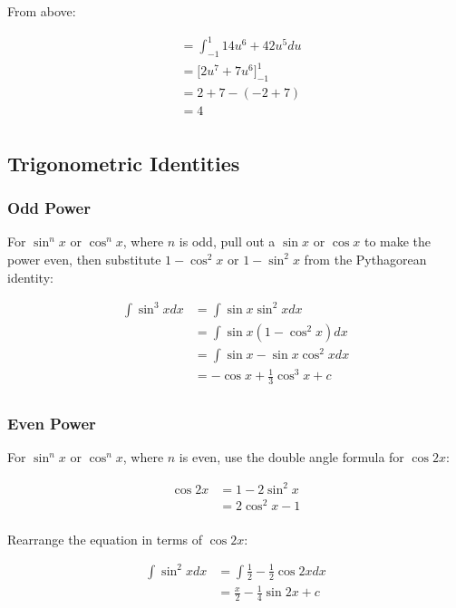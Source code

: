 \documentclass[a4paper,11pt]{report}
\begin{document}
From above:

$$
\begin{aligned}
& = \int_{-1}^1 14u^6 + 42u^5 du \\
& = \big[2u^7 + 7u^6\big]_{-1}^1 \\
& = 2 + 7 - (-2 + 7) \\
& = 4 \\
\end{aligned}
$$

\subsection{Trigonometric Identities}

\subsubsection{Odd Power}

For $\sin^n{x}$ or $\cos^n{x}$, where $n$ is odd, pull out a $\sin{x}$ or
$\cos{x}$ to make the power even, then substitute $1 - \cos^2{x}$ or
$1 - \sin^2{x}$ from the Pythagorean identity:

$$
\begin{aligned}
\int \sin^3{x} dx & = \int \sin{x}\sin^2{x} dx \\
& = \int \sin{x}(1 - \cos^2{x}) dx \\
& = \int \sin{x} - \sin{x}\cos^2{x} dx \\
& = -\cos{x} + \frac{1}{3} \cos^3{x} + c \\
\end{aligned}
$$

\subsubsection{Even Power}

For $\sin^n{x}$ or $\cos^n{x}$, where $n$ is even, use the double angle formula
for $\cos{2x}$:

$$
\begin{aligned}
\cos{2x} & = 1 - 2\sin^2{x} \\
& = 2\cos^2{x} - 1 \\
\end{aligned}
$$

Rearrange the equation in terms of $\cos{2x}$:

$$
\begin{aligned}
\int \sin^2{x} dx & = \int \frac{1}{2} - \frac{1}{2}\cos{2x} dx \\
& = \frac{x}{2} - \frac{1}{4}\sin{2x} + c \\
\end{aligned}
$$
\end{document}

